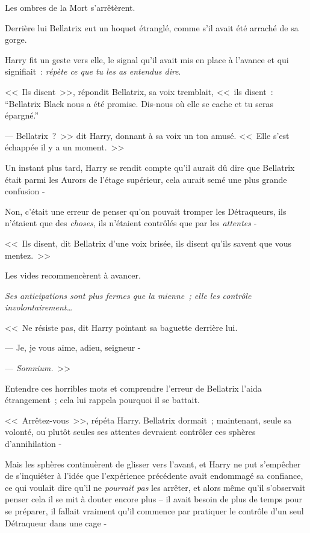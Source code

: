 Les ombres de la Mort s'arrêtèrent.

Derrière lui Bellatrix eut un hoquet étranglé, comme s'il avait été arraché de sa gorge.

Harry fit un geste vers elle, le signal qu'il avait mis en place à l'avance et qui signifiait~: \emph{répète ce que tu les as entendus dire}.

<<~Ils disent~>>, répondit Bellatrix, sa voix tremblait, <<~ils disent~: “Bellatrix Black nous a été promise. Dis-nous où elle se cache et tu seras épargné.”

--- Bellatrix~?~>> dit Harry, donnant à sa voix un ton amusé. <<~Elle s'est échappée il y a un moment.~>>

Un instant plus tard, Harry se rendit compte qu'il aurait dû dire que Bellatrix était parmi les Aurors de l'étage supérieur, cela aurait semé une plus grande confusion -

Non, c'était une erreur de penser qu'on pouvait tromper les Détraqueurs, ils n'étaient que des \emph{choses}, ils n'étaient contrôlés que par les \emph{attentes} -

<<~Ils disent, dit Bellatrix d'une voix brisée, ils disent qu'ils savent que vous mentez.~>>

Les vides recommencèrent à avancer.

\emph{Ses anticipations sont plus fermes que la mienne~; elle les contrôle involontairement…}

<<~Ne résiste pas, dit Harry pointant sa baguette derrière lui.

--- Je, je vous aime, adieu, seigneur -

--- \emph{Somnium.}~>>

Entendre ces horribles mots et comprendre l'erreur de Bellatrix l'aida étrangement~; cela lui rappela pourquoi il se battait.

<<~Arrêtez-vous~>>, répéta Harry. Bellatrix dormait~; maintenant, seule sa volonté, ou plutôt seules ses attentes devraient contrôler ces sphères d'annihilation -

Mais les sphères continuèrent de glisser vers l'avant, et Harry ne put s'empêcher de s'inquiéter à l'idée que l'expérience précédente avait endommagé sa confiance, ce qui voulait dire qu'il ne \emph{pourrait pas} les arrêter, et alors même qu'il s'observait penser cela il se mit à douter encore plus -- il avait besoin de plus de temps pour se préparer, il fallait vraiment qu'il commence par pratiquer le contrôle d'un seul Détraqueur dans une cage -

